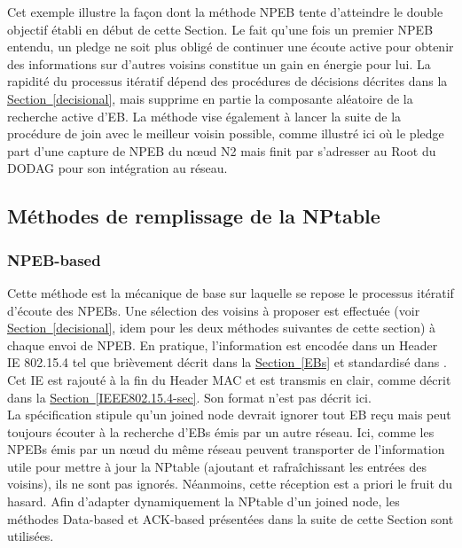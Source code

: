 \documentclass[]{report}
\newcommand{\wordlink}[2]{\hyperref[#2]{#1~\ref{#2}}}
\begin{document}
Cet exemple illustre la façon dont la méthode NPEB tente d'atteindre le double objectif établi en début de cette Section. Le fait qu'une fois un premier NPEB entendu, un pledge ne soit plus obligé de continuer une écoute active pour obtenir des informations sur d'autres voisins constitue un gain en énergie pour lui. La rapidité du processus itératif dépend des procédures de décisions décrites dans la \wordlink{Section}{decisional}, mais supprime en partie la composante aléatoire de la recherche active d'EB. La méthode vise également à lancer la suite de la procédure de join avec le meilleur voisin possible, comme illustré ici  où le pledge part d'une capture de NPEB du nœud N2 mais finit par s'adresser au Root du DODAG pour son intégration au réseau.

\subsection{Méthodes de remplissage de la NPtable}
\label{feed_NPtable}

\subsubsection{NPEB-based}

Cette méthode est la mécanique de base sur laquelle se repose le processus itératif d'écoute des NPEBs. Une sélection des voisins à proposer est effectuée (voir \wordlink{Section}{decisional}, idem pour les deux méthodes suivantes de cette section) à chaque envoi de NPEB. En pratique, l'information est encodée dans un Header IE 802.15.4 tel que brièvement décrit dans la \wordlink{Section}{EBs} et standardisé dans \cite{IEEE802.15.4}. Cet IE est rajouté à la fin du Header MAC et est transmis en clair, comme décrit dans la \wordlink{Section}{IEEE802.15.4-sec}. Son format n'est pas décrit ici.\\

La spécification \cite{rfc8180} stipule qu'un joined node devrait ignorer tout EB reçu mais peut toujours écouter à la recherche d'EBs émis par un autre réseau. Ici, comme les NPEBs émis par un nœud du même réseau peuvent transporter de l'information utile pour mettre à jour la NPtable (ajoutant et rafraîchissant les entrées des voisins), ils ne sont pas ignorés. Néanmoins, cette réception est a priori le fruit du hasard. Afin d'adapter dynamiquement la NPtable d'un joined node, les méthodes Data-based et ACK-based présentées dans la suite de cette Section sont utilisées.
\end{document}
